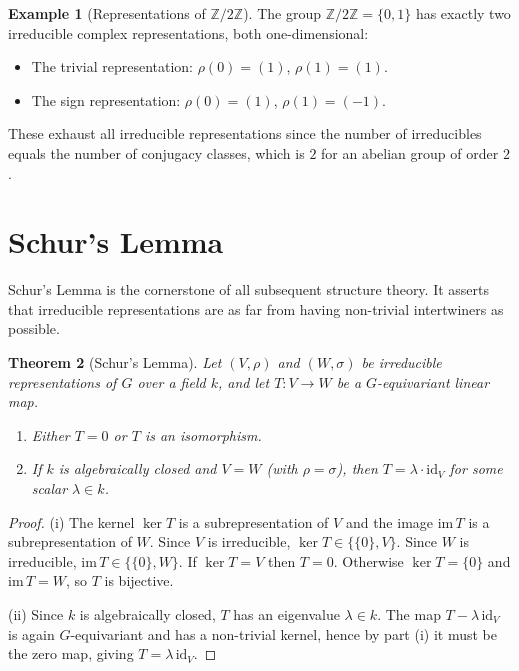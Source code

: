 \documentclass[12pt,a4paper]{amsart}
\newtheorem{theorem}{Theorem}[section]
\theoremstyle{definition}
\newtheorem{example}[theorem]{Example}
\begin{document}
\begin{example}[Representations of $\mathbb{Z}/2\mathbb{Z}$]
The group $\mathbb{Z}/2\mathbb{Z} = \{0,1\}$ has exactly two irreducible complex
representations, both one-dimensional:
\begin{itemize}
  \item The trivial representation: $\rho(0) = (1)$, $\rho(1) = (1)$.
  \item The sign representation: $\rho(0) = (1)$, $\rho(1) = (-1)$.
\end{itemize}
These exhaust all irreducible representations since the number of irreducibles
equals the number of conjugacy classes, which is $2$ for an abelian group of
order $2$.
\end{example}

\section{Schur's Lemma}
\label{sec:schur}

Schur's Lemma is the cornerstone of all subsequent structure theory.  It asserts
that irreducible representations are as far from having non-trivial intertwiners
as possible.

\begin{theorem}[Schur's Lemma]
\label{thm:schur}
Let $(V,\rho)$ and $(W,\sigma)$ be irreducible representations of $G$ over a
field $k$, and let $T \colon V \to W$ be a $G$-equivariant linear map.
\begin{enumerate}[label=\textup{(\roman*)}]
  \item Either $T = 0$ or $T$ is an isomorphism.
  \item If $k$ is algebraically closed and $V = W$ (with $\rho = \sigma$), then
        $T = \lambda \cdot \mathrm{id}_V$ for some scalar $\lambda \in k$.
\end{enumerate}
\end{theorem}

\begin{proof}
(i) The kernel $\ker T$ is a subrepresentation of $V$ and the image $\mathrm{im}\,T$
is a subrepresentation of $W$.  Since $V$ is irreducible, $\ker T \in \{\{0\},V\}$.
Since $W$ is irreducible, $\mathrm{im}\, T \in \{\{0\},W\}$.  If $\ker T = V$
then $T = 0$.  Otherwise $\ker T = \{0\}$ and $\mathrm{im}\, T = W$, so $T$ is
bijective.

(ii) Since $k$ is algebraically closed, $T$ has an eigenvalue $\lambda \in k$.
The map $T - \lambda\,\mathrm{id}_V$ is again $G$-equivariant and has a non-trivial
kernel, hence by part (i) it must be the zero map, giving $T = \lambda\,\mathrm{id}_V$.
\end{proof}
\end{document}
